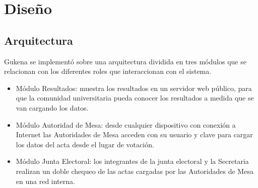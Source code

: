 \section{Diseño}

\subsection{Arquitectura}
Gukena se implementó sobre una arquitectura dividida en tres módulos que se relacionan con los diferentes roles que interaccionan con el sistema.
\begin{itemize}
\item Módulo Resultados: muestra los resultados en un servidor web público, para que la comunidad universitaria pueda conocer los resultados a medida que se van cargando los datos.
\item Módulo Autoridad de Mesa: desde cualquier dispositivo con conexión a Internet las Autoridades de Mesa acceden con su usuario y clave para cargar los datos del acta desde el lugar de votación.
\item Módulo Junta Electoral: los integrantes de la junta electoral y la Secretaria realizan un doble chequeo de las actas cargadas por las Autoridades de Mesa en una red interna.
\end{itemize}

